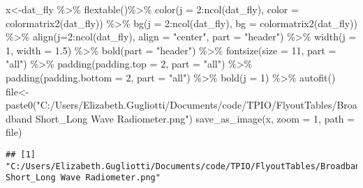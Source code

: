 \documentclass[
]{article}
\newenvironment{Shaded}{\begin{snugshade}}{\end{snugshade}}
\newcommand{\AttributeTok}[1]{\textcolor[rgb]{0.77,0.63,0.00}{#1}}
\newcommand{\DecValTok}[1]{\textcolor[rgb]{0.00,0.00,0.81}{#1}}
\newcommand{\FloatTok}[1]{\textcolor[rgb]{0.00,0.00,0.81}{#1}}
\newcommand{\FunctionTok}[1]{\textcolor[rgb]{0.00,0.00,0.00}{#1}}
\newcommand{\NormalTok}[1]{#1}
\newcommand{\OtherTok}[1]{\textcolor[rgb]{0.56,0.35,0.01}{#1}}
\newcommand{\SpecialCharTok}[1]{\textcolor[rgb]{0.00,0.00,0.00}{#1}}
\newcommand{\StringTok}[1]{\textcolor[rgb]{0.31,0.60,0.02}{#1}}
\begin{document}
\begin{Shaded}
\begin{Highlighting}[]
\NormalTok{x}\OtherTok{\textless{}{-}}\NormalTok{dat\_fly }\SpecialCharTok{\%\textgreater{}\%}
    \FunctionTok{flextable}\NormalTok{()}\SpecialCharTok{\%\textgreater{}\%}
    \FunctionTok{color}\NormalTok{(}\AttributeTok{j =} \DecValTok{2}\SpecialCharTok{:}\FunctionTok{ncol}\NormalTok{(dat\_fly), }\AttributeTok{color =} \FunctionTok{colormatrix2}\NormalTok{(dat\_fly)) }\SpecialCharTok{\%\textgreater{}\%}
    \FunctionTok{bg}\NormalTok{(}\AttributeTok{j =} \DecValTok{2}\SpecialCharTok{:}\FunctionTok{ncol}\NormalTok{(dat\_fly), }\AttributeTok{bg =} \FunctionTok{colormatrix2}\NormalTok{(dat\_fly)) }\SpecialCharTok{\%\textgreater{}\%}
    \FunctionTok{align}\NormalTok{(}\AttributeTok{j=}\DecValTok{2}\SpecialCharTok{:}\FunctionTok{ncol}\NormalTok{(dat\_fly), }\AttributeTok{align =} \StringTok{"center"}\NormalTok{, }\AttributeTok{part =} \StringTok{"header"}\NormalTok{) }\SpecialCharTok{\%\textgreater{}\%}
    \FunctionTok{width}\NormalTok{(}\AttributeTok{j =} \DecValTok{1}\NormalTok{, }\AttributeTok{width =} \FloatTok{1.5}\NormalTok{) }\SpecialCharTok{\%\textgreater{}\%}
    \FunctionTok{bold}\NormalTok{(}\AttributeTok{part =} \StringTok{"header"}\NormalTok{) }\SpecialCharTok{\%\textgreater{}\%}
    \FunctionTok{fontsize}\NormalTok{(}\AttributeTok{size =} \DecValTok{11}\NormalTok{, }\AttributeTok{part =} \StringTok{"all"}\NormalTok{) }\SpecialCharTok{\%\textgreater{}\%}
    \FunctionTok{padding}\NormalTok{(}\AttributeTok{padding.top =} \DecValTok{2}\NormalTok{, }\AttributeTok{part =} \StringTok{"all"}\NormalTok{) }\SpecialCharTok{\%\textgreater{}\%}
    \FunctionTok{padding}\NormalTok{(}\AttributeTok{padding.bottom =} \DecValTok{2}\NormalTok{, }\AttributeTok{part =} \StringTok{"all"}\NormalTok{) }\SpecialCharTok{\%\textgreater{}\%}
    \FunctionTok{bold}\NormalTok{(}\AttributeTok{j =} \DecValTok{1}\NormalTok{) }\SpecialCharTok{\%\textgreater{}\%} \FunctionTok{autofit}\NormalTok{()}
\NormalTok{file}\OtherTok{\textless{}{-}}\FunctionTok{paste0}\NormalTok{(}\StringTok{"C:/Users/Elizabeth.Gugliotti/Documents/code/TPIO/FlyoutTables/Broadband Short\_Long Wave Radiometer.png"}\NormalTok{)}
\FunctionTok{save\_as\_image}\NormalTok{(x, }\AttributeTok{zoom =} \DecValTok{1}\NormalTok{, }\AttributeTok{path =}\NormalTok{ file)}
\end{Highlighting}
\end{Shaded}

\begin{verbatim}
## [1] "C:/Users/Elizabeth.Gugliotti/Documents/code/TPIO/FlyoutTables/Broadband Short_Long Wave Radiometer.png"
\end{verbatim}
\end{document}
